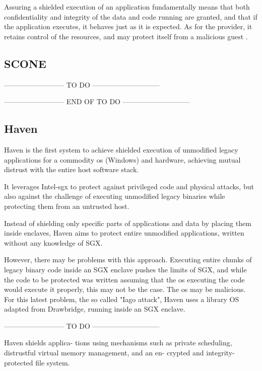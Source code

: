 Assuring a shielded execution of an application fundamentally means that both confidentiality and integrity of the data and code running are granted, and that if the application executes, it behaves just as it is expected. As for the provider, it retains control of the resources, and may protect itself from a malicious guest \cite{havenPaper}. 


\subsection{SCONE}
-------------------------- TO DO -----------------------------



-------------------------- END OF TO DO -----------------------------

\subsection{Haven}

Haven is the first system to achieve shielded execution of unmodified legacy applications for a commodity \gls{os} (Windows) and hardware, achieving mutual distrust with the entire host software stack.

It leverages Intel-\gls{sgx} to protect against privileged code and physical attacks, but also against the challenge of executing unmodified legacy binaries while protecting them from an untrusted host.

Instead of shielding only specific parts of applications and data by placing them inside enclaves, Haven aims to protect entire unmodified applications, written without any knowledge of SGX. 

However, there may be problems with this approach. 
Executing entire chunks of legacy binary code inside an SGX enclave pushes the limits of SGX, and while the code to be protected was written assuming that the \gls{os} executing the code would execute it properly, this may not be the case. The \gls{os} may be malicious. For this latest problem, the so called "Iago attack", Haven uses a library OS adapted from Drawbridge, running inside an SGX enclave.


-------------------------- TO DO -----------------------------

Haven shields applica-
tions using mechanisms such as private scheduling,
distrustful virtual memory management, and an en-
crypted and integrity-protected file system.



